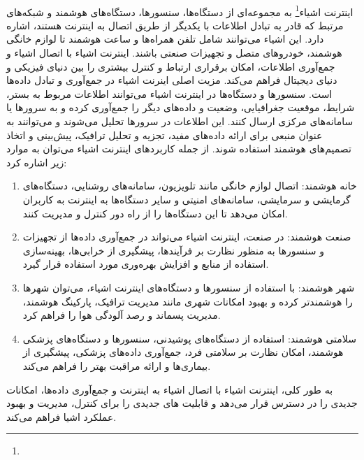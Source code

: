 \paragraph{}
{   
    اینترنت اشیاء\footnote{} به مجموعه‌ای از دستگاه‌ها، سنسورها، دستگاه‌های هوشمند و شبکه‌های مرتبط که قادر
    به تبادل اطلاعات با یکدیگر از طریق اتصال به اینترنت هستند، اشاره دارد. این اشیاء می‌توانند شامل تلفن همراه‌ها و ساعت هوشمند تا لوازم
    خانگی هوشمند، خودروهای متصل و تجهیزات صنعتی باشند. اینترنت اشیاء با اتصال اشیاء و جمع‌آوری اطلاعات، امکان برقراری ارتباط و کنترل 
    بیشتری را بین دنیای فیزیکی و دنیای دیجیتال فراهم می‌کند. مزیت اصلی اینرنت اشیاء در جمع‌آوری و تبادل داده‌ها است. سنسورها و دستگاه‌ها 
    در اینترنت اشیاء می‌توانند اطلاعات مربوط به بستر، شرایط، موقعیت جغرافیایی، وضعیت و داده‌های دیگر را جمع‌آوری کرده و به سرورها یا سامانه‌های 
    مرکزی ارسال کنند. این اطلاعات در سرورها تحلیل می‌شوند و می‌توانند به عنوان منبعی برای ارائه داده‌های مفید، تجزیه و تحلیل ترافیک، پیش‌بینی و 
    اتخاذ تصمیم‌های هوشمند استفاده شوند. از جمله کاربردهای اینترنت اشیاء می‌توان به موارد زیر اشاره کرد:
    \begin{enumerate}
        \item خانه هوشمند: اتصال لوازم خانگی مانند تلویزیون، سامانه‌های روشنایی، دستگاه‌های گرمایشی و سرمایشی، سامانه‌های امنیتی و سایر دستگاه‌ها به اینترنت به کاربران امکان می‌دهد تا این دستگاه‌ها را از راه دور کنترل و مدیریت کنند.
        \item صنعت هوشمند: در صنعت، اینترنت اشیاء می‌تواند در جمع‌آوری داده‌ها از تجهیزات و سنسورها به منظور نظارت بر فرآیندها، پیشگیری از خرابی‌ها، بهینه‌سازی استفاده از منابع و افزایش بهره‌وری مورد استفاده قرار گیرد.
        \item شهر هوشمند: با استفاده از سنسورها و دستگاه‌های اینترنت اشیاء، می‌توان شهرها را هوشمندتر کرده و بهبود امکانات شهری مانند مدیریت ترافیک، پارکینگ هوشمند، مدیریت پسماند و رصد آلودگی هوا را فراهم کرد.
        \item سلامتی هوشمند: استفاده از دستگاه‌های پوشیدنی، سنسورها و دستگاه‌های پزشکی هوشمند، امکان نظارت بر سلامتی فرد، جمع‌آوری داده‌های پزشکی، پیشگیری از بیماری‌ها و ارائه مراقبت بهتر را فراهم می‌کند.
    \end{enumerate}
    به طور کلی، اینترنت اشیاء با اتصال اشیاء به اینترنت و جمع‌آوری داده‌ها، امکانات جدیدی را در دسترس قرار می‌دهد و قابلیت های جدیدی را برای کنترل، مدیریت و بهبود عملکرد اشیا فراهم می‌کند.
    \begin{figure}[H]

\end{figure}}
